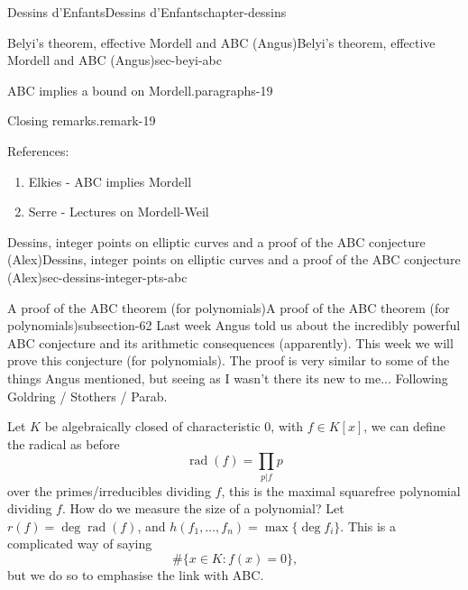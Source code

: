 \documentclass[oneside,10pt,]{book}
\numberwithin{equation}{section}
\newcommand{\lb}{[}
\newcommand{\rb}{]}
\begin{document}
\begin{chapterptx}{Dessins d'Enfants}{}{Dessins d'Enfants}{}{}{chapter-dessins}
\begin{sectionptx}{Belyi's theorem, effective Mordell and ABC (Angus)}{}{Belyi's theorem, effective Mordell and ABC (Angus)}{}{}{sec-beyi-abc}
\begin{paragraphs}{ABC implies a bound on Mordell.}{paragraphs-19}
\begin{remark}{Closing remarks.}{remark-19}
\end{remark}
\hypertarget{p-697}{}%
References:\leavevmode%
\begin{enumerate}
\item\hypertarget{li-148}{}Elkies - ABC implies Mordell%
\item\hypertarget{li-149}{}Serre - Lectures on Mordell-Weil%
\end{enumerate}
%
\end{paragraphs}%
\end{sectionptx}
%
%
\typeout{************************************************}
\typeout{************************************************}
%
\begin{sectionptx}{Dessins, integer points on elliptic curves and a proof of the ABC conjecture (Alex)}{}{Dessins, integer points on elliptic curves and a proof of the ABC conjecture (Alex)}{}{}{sec-dessins-integer-pts-abc}
%
%
\typeout{************************************************}
\typeout{************************************************}
%
\begin{subsectionptx}{A proof of the ABC theorem (for polynomials)}{}{A proof of the ABC theorem (for polynomials)}{}{}{subsection-62}
\hypertarget{p-698}{}%
Last week Angus told us about the incredibly powerful ABC conjecture and its arithmetic consequences (apparently). This week we will prove this conjecture (for polynomials). The proof is very similar to some of the things Angus mentioned, but seeing as I wasn't there its new to me... Following Goldring / Stothers / Parab.%
\par
\hypertarget{p-699}{}%
Let \(K\) be algebraically closed of characteristic 0, with \(f \in K\lb x \rb\), we can define the radical as before%
\begin{equation*}
\operatorname{rad}(f) = \prod_{p | f} p
\end{equation*}
over the primes/irreducibles dividing \(f\), this is the maximal squarefree polynomial dividing \(f\). How do we measure the size of a polynomial? Let \(r(f) = \deg \operatorname{rad}(f)\), and \(h(f_1, \ldots, f_n) = \max\{\deg f_i\}\). This is a complicated way of saying%
\begin{equation*}
\#\{x \in K : f(x) = 0 \}\text{,}
\end{equation*}
but we do so to emphasise the link with ABC.%
\par
\hypertarget{p-700}{}%

\end{subsectionptx}
\end{sectionptx}
\end{chapterptx}
\end{document}
